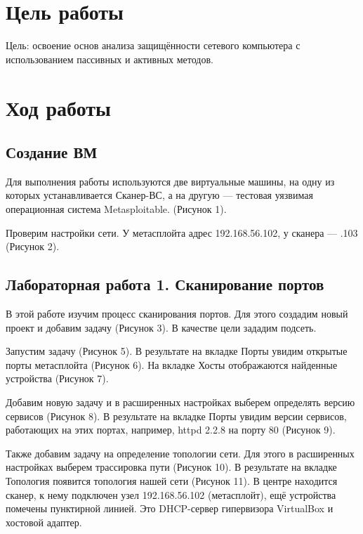 \section{Цель работы}
Цель: освоение основ анализа защищённости сетевого компьютера с
использованием пассивных и активных методов.

\section{Ход работы}
\subsection{Создание ВМ}
Для выполнения работы используются две виртуальные машины, на одну из которых устанавливается Сканер-ВС, а на другую — тестовая уязвимая операционная система Metasploitable. (Рисунок 1).

\FloatBarrier

Проверим настройки сети. У метасплойта адрес 192.168.56.102, у сканера — .103 (Рисунок 2).

\FloatBarrier
\clearpage


\subsection{Лабораторная работа 1. Сканирование портов}
В этой работе изучим процесс сканирования портов. Для этого создадим новый проект и добавим задачу (Рисунок 3). В качестве цели зададим подсеть.

\FloatBarrier

Запустим задачу (Рисунок 5). В результате на вкладке Порты увидим открытые порты метасплойта (Рисунок 6). На вкладке Хосты отображаются найденные устройства (Рисунок 7).

\FloatBarrier

Добавим новую задачу и в расширенных настройках выберем определять версию сервисов (Рисунок 8). В результате на вкладке Порты увидим версии сервисов, работающих на этих портах, например, httpd 2.2.8 на порту 80 (Рисунок 9).

\FloatBarrier

Также добавим задачу на определение топологии сети. Для этого в расширенных настройках выберем трассировка пути (Рисунок 10). В результате на вкладке Топология появится топология нашей сети (Рисунок 11). В центре находится сканер, к нему подключен узел 192.168.56.102 (метасплойт), ещё устройства помечены пунктирной линией. Это DHCP-сервер гипервизора VirtualBox и хостовой адаптер.

